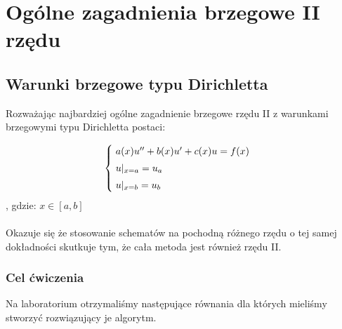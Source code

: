 \section{Ogólne zagadnienia brzegowe II rzędu}
\subsection{Warunki brzegowe typu Dirichletta}

Rozważając najbardziej ogólne zagadnienie brzegowe rzędu II z warunkami brzegowymi typu Dirichletta postaci:

\[
\begin{cases}
\vspace{0.1cm} 
\hspace{0,1cm} a(x) u'' + b(x)u' + c(x)u =f(x) \\
\vspace{0.1cm}
\hspace{0,1cm}u|_{x=a} = u_{a} \\
\hspace{0,1cm}u|_{x=b} = u_{b}
\end{cases}
\]
, gdzie:
$x\in[a,b]$
\\
\\
Okazuje się że stosowanie schematów na pochodną różnego rzędu o tej samej dokładności skutkuje tym, że cała metoda jest również rzędu II.

\subsubsection{Cel ćwiczenia}
Na laboratorium otrzymaliśmy następujące równania dla których mieliśmy stworzyć rozwiązujący je algorytm.

